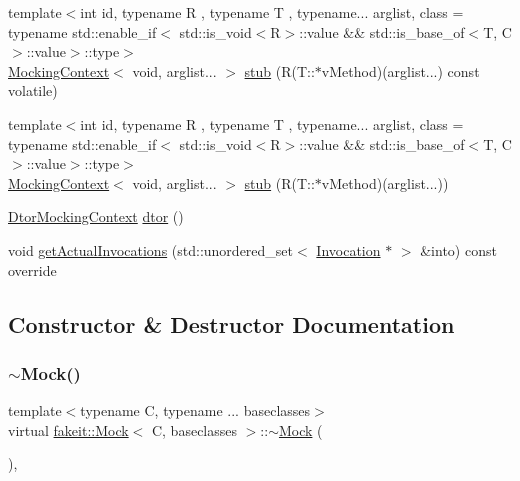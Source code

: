 \begin{DoxyCompactItemize}
\item 
{\footnotesize template$<$int id, typename R , typename T , typename... arglist, class  = typename std\+::enable\+\_\+if$<$                std\+::is\+\_\+void$<$\+R$>$\+::value \&\& std\+::is\+\_\+base\+\_\+of$<$\+T, C$>$\+::value$>$\+::type$>$ }\\\mbox{\hyperlink{classfakeit_1_1MockingContext}{Mocking\+Context}}$<$ void, arglist... $>$ \mbox{\hyperlink{classfakeit_1_1Mock_a22b83b574e4db2689c8a1f3375554035}{stub}} (R(T\+::$\ast$v\+Method)(arglist...) const volatile)
\item 
{\footnotesize template$<$int id, typename R , typename T , typename... arglist, class  = typename std\+::enable\+\_\+if$<$                std\+::is\+\_\+void$<$\+R$>$\+::value \&\& std\+::is\+\_\+base\+\_\+of$<$\+T, C$>$\+::value$>$\+::type$>$ }\\\mbox{\hyperlink{classfakeit_1_1MockingContext}{Mocking\+Context}}$<$ void, arglist... $>$ \mbox{\hyperlink{classfakeit_1_1Mock_aeedcaacc82d12295f11c3fc454b75554}{stub}} (R(T\+::$\ast$v\+Method)(arglist...))
\item 
\mbox{\hyperlink{classfakeit_1_1DtorMockingContext}{Dtor\+Mocking\+Context}} \mbox{\hyperlink{classfakeit_1_1Mock_a5c25c5db6e0e1b955137a1330f7348b9}{dtor}} ()
\item 
void \mbox{\hyperlink{classfakeit_1_1Mock_a107ca653b36eb6f72bf9d5acb13c26d8}{get\+Actual\+Invocations}} (std\+::unordered\+\_\+set$<$ \mbox{\hyperlink{structfakeit_1_1Invocation}{Invocation}} $\ast$ $>$ \&into) const override
\end{DoxyCompactItemize}


\subsection{Constructor \& Destructor Documentation}
\mbox{\label{classfakeit_1_1Mock_af5ecff29779ab75289c260d0a56705ab}} 
\subsubsection{\texorpdfstring{$\sim$Mock()}{~Mock()}\hspace{0.1cm}{\footnotesize\ttfamily [1/9]}}
{\footnotesize\ttfamily template$<$typename C, typename ... baseclasses$>$ \\
virtual \mbox{\hyperlink{classfakeit_1_1Mock}{fakeit\+::\+Mock}}$<$ C, baseclasses $>$\+::$\sim$\mbox{\hyperlink{classfakeit_1_1Mock}{Mock}} (\begin{DoxyParamCaption}{ }\end{DoxyParamCaption})\hspace{0.3cm}{\ttfamily [virtual]}, {\ttfamily [default]}}

